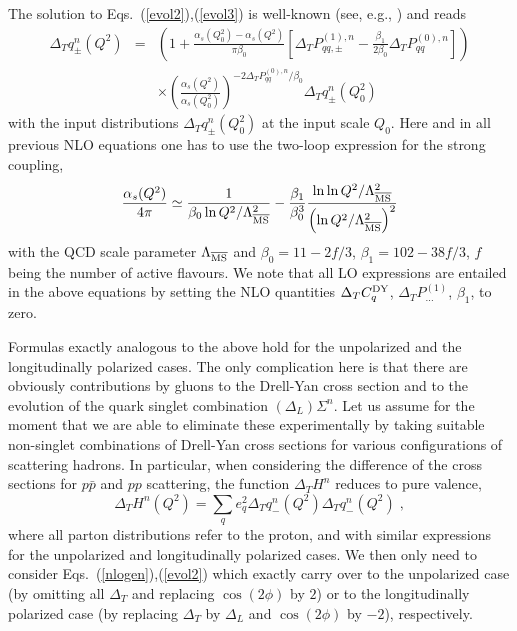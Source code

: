 The solution to Eqs.~(\ref{evol2}),(\ref{evol3}) is well-known (see, e.g.,
\cite{gr}) and reads
\begin{eqnarray} \label{evsol}
\nonumber
\Delta_T q_{\pm}^n (Q^2) &=& \left( 1+\frac{\alpha_s (Q_0^2)-
\alpha_s (Q^2)}{\pi\beta_0}\!
\left[ \Delta_T P_{qq,\pm}^{(1),n}-\frac{\beta_1}{2\beta_0} \Delta_T 
P_{qq}^{(0),n} \right] \right)\\
&&\times
\left( \frac{\alpha_s (Q^2)}{\alpha_s (Q_0^2)}\right)^{-2\Delta_T 
P_{qq}^{(0),n}/ \beta_0}\! \Delta_T q_{\pm}^n (Q_0^2)
\end{eqnarray}
with the input distributions $\Delta_T q_{\pm}^n (Q_0^2)$ at the input scale 
$Q_0$. Here and in all previous NLO equations one has to use the two-loop 
expression for the strong coupling,
\begin{equation}
\frac{\alpha_s(Q^2)}{4\pi} \simeq \frac{1}{\beta_0
\ln Q^2/\Lambda_{\overline{\rm{MS}}}^2}-
\frac{\beta_1}{\beta_0^3} \frac{\ln\ln Q^2/\Lambda_{\overline{\rm{MS}}}^2}
{\left( \ln Q^2/\Lambda_{\overline{\rm{MS}}}^2\right)^2}
\end{equation}
with the QCD scale parameter $\Lambda_{\overline{\rm{MS}}}$ and $\beta_0 = 
11-2f/3$, $\beta_1=102-38f/3$, $f$ being the number of active flavours.
We note that all LO expressions are entailed in the above equations by
setting the NLO quantities $\Delta_T C_q^{{\small {\rm DY}}}$, 
$\Delta_T P_{\ldots}^{(1)}$, $\beta_1$, to zero.

Formulas exactly analogous to the above hold for the unpolarized and the 
longitudinally polarized cases. The only complication here is that there
are obviously contributions by gluons to the Drell-Yan cross section and to 
the evolution of the quark singlet combination $(\Delta_L) \Sigma^n$. Let us 
assume for the moment that we are able to eliminate these experimentally by 
taking suitable non-singlet combinations of Drell-Yan cross sections for
various configurations of scattering hadrons. In particular, when considering
the difference of the cross sections for $p\bar{p}$ and $pp$ scattering,
the function $\Delta_T H^n$ reduces to pure valence,
\begin{equation} \label{hdef2}
\Delta_T H^n (Q^2) = \sum_q e_q^2 \Delta_T q_{-}^n (Q^2) \Delta_T 
q_{-}^n (Q^2) \; ,
\end{equation}
where all parton distributions refer to the proton, and with similar
expressions for the unpolarized and longitudinally polarized cases. 
We then only need to consider Eqs.~(\ref{nlogen}),(\ref{evol2}) which 
exactly carry over to the unpolarized case (by omitting all $\Delta_T$ 
and replacing $\cos (2\phi)$ by $2$) or to the longitudinally 
polarized case (by replacing $\Delta_T$ by $\Delta_L$ and $\cos (2\phi)$
by $-2$), respectively. 

